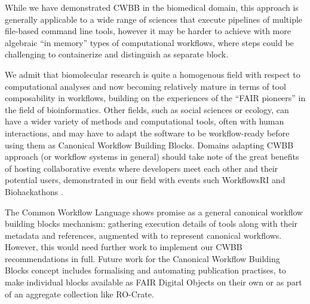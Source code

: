 While we have demonstrated CWBB in the biomedical domain, this approach
is generally applicable to a wide range of sciences that execute
pipelines of multiple file-based command line tools, however it may be
harder to achieve with more algebraic ``in memory'' types of
computational workflows, where steps could be challenging to
containerize and distinguish as separate block.

We admit that biomolecular research is quite a homogenous field with
respect to computational analyses and now becoming relatively mature in
terms of tool composability in workflows, building on the experiences of
the ``FAIR pioneers'' in the field of bioinformatics. Other fields, such
as social sciences or ecology, can have a wider variety of methods and
computational tools, often with human interactions, and may have to
adapt the software to be workflow-ready \cite{ch6-37} before using them as
Canonical Workflow Building Blocks. Domains adapting CWBB approach (or
workflow systems in general) should take note of the great benefits of
hosting collaborative events where developers meet each other and their
potential users, demonstrated in our field with events such WorkflowsRI
\cite{ch6-39} and Biohackathons \cite{ch6-40}.

The Common Workflow Language shows promise as a general canonical
workflow building blocks mechanism: gathering execution details of tools
along with their metadata and references, augmented with
 to represent canonical workflows. However, this would need
further work to implement our CWBB recommendations in full. Future work
for the Canonical Workflow Building Blocks concept includes formalising
and automating publication practises, to make individual blocks
available as FAIR Digital Objects on their own or as part of an
aggregate collection like RO-Crate.
